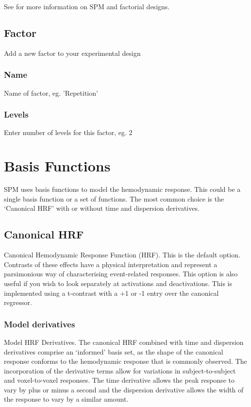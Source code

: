 See \cite{rnah_anova} for more information on SPM and factorial designs.

\subsection{Factor}
Add a new factor to your experimental design


\subsubsection{Name}
Name of factor, eg. 'Repetition' 


\subsubsection{Levels}
Enter number of levels for this factor, eg. 2


\section{Basis Functions}

SPM uses basis functions to model the hemodynamic response. This could 
be a single basis function or a set of functions.
The most common choice is the `Canonical HRF' with or without time and dispersion derivatives. 


\subsection{Canonical HRF}
Canonical Hemodynamic Response Function (HRF). This is the default option. Contrasts of these effects have a physical interpretation and represent a parsimonious way of characterising event-related responses. This option is also useful if you wish to look separately at activations and deactivations. This is implemented using a t-contrast with a +1 or -1 entry over the canonical regressor. 


\subsubsection{Model derivatives}
Model HRF Derivatives. The canonical HRF combined with time and dispersion derivatives comprise an `informed' basis set, as the shape of the canonical response conforms to the hemodynamic response that is commonly observed. The incorporation of the derivative terms allow for variations in subject-to-subject and voxel-to-voxel responses. The time derivative allows the peak response to vary by plus or minus a second and the dispersion derivative allows the width of the response to vary by a similar amount. 

